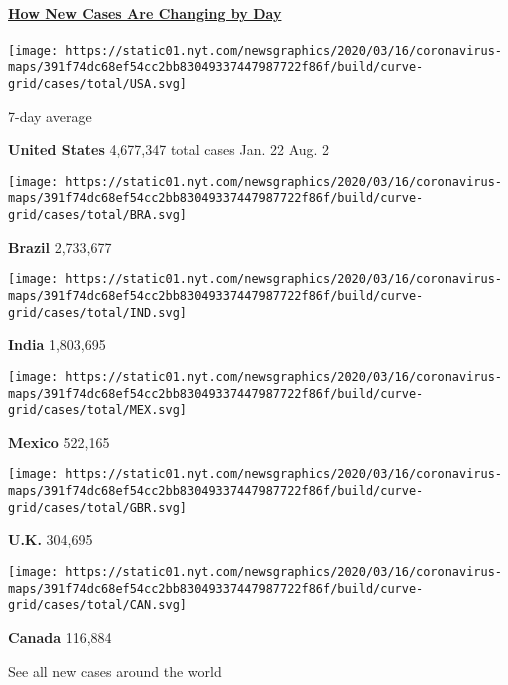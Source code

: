 \subsection{}

\hypertarget{how-new-cases-are-changing-by-day}{%
\paragraph{\texorpdfstring{\href{https://www.nytimes.com/interactive/2020/world/coronavirus-maps.html}{How
New Cases Are Changing by
Day}}{How New Cases Are Changing by Day}}\label{how-new-cases-are-changing-by-day}}

\texttt{[image: https://static01.nyt.com/newsgraphics/2020/03/16/coronavirus-maps/391f74dc68ef54cc2bb83049337447987722f86f/build/curve-grid/cases/total/USA.svg]}

7-day average

\textbf{United States} 4,677,347 total cases Jan. 22 Aug. 2

\texttt{[image: https://static01.nyt.com/newsgraphics/2020/03/16/coronavirus-maps/391f74dc68ef54cc2bb83049337447987722f86f/build/curve-grid/cases/total/BRA.svg]}

\textbf{Brazil} 2,733,677

\texttt{[image: https://static01.nyt.com/newsgraphics/2020/03/16/coronavirus-maps/391f74dc68ef54cc2bb83049337447987722f86f/build/curve-grid/cases/total/IND.svg]}

\textbf{India} 1,803,695

\texttt{[image: https://static01.nyt.com/newsgraphics/2020/03/16/coronavirus-maps/391f74dc68ef54cc2bb83049337447987722f86f/build/curve-grid/cases/total/MEX.svg]}

\textbf{Mexico} 522,165

\texttt{[image: https://static01.nyt.com/newsgraphics/2020/03/16/coronavirus-maps/391f74dc68ef54cc2bb83049337447987722f86f/build/curve-grid/cases/total/GBR.svg]}

\textbf{U.K.} 304,695

\texttt{[image: https://static01.nyt.com/newsgraphics/2020/03/16/coronavirus-maps/391f74dc68ef54cc2bb83049337447987722f86f/build/curve-grid/cases/total/CAN.svg]}

\textbf{Canada} 116,884

\href{https://www.nytimes.com/interactive/2020/world/coronavirus-maps.html}{}

See all new cases around the world

\href{https://www.nytimes.com/2020/08/02/world/coronavirus-updates.html}{}

